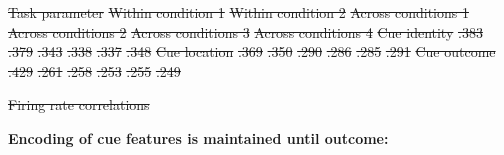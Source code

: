 \documentclass[11pt]{article}
\providecommand{\DIFdel}[1]{{\protect\color{red}\sout{#1}}}                      %
\providecommand{\DIFdelend}{} %
\providecommand{\DIFdelFL}[1]{\DIFdel{#1}} %
\providecommand{\DIFdelbeginFL}{} %
\providecommand{\DIFdelendFL}{} %
\newcommand{\DIFscaledelfig}{0.5}
\newlength{\DIFdelgraphicswidth} %
\newlength{\DIFdelgraphicsheight} %
\newcommand{\DIFdelincludegraphics}[2][]{%
\sbox{\DIFdelgraphicsbox}{\DIFOincludegraphics[#1]{#2}}%
\settoboxwidth{\DIFdelgraphicswidth}{\DIFdelgraphicsbox} %
\settoboxtotalheight{\DIFdelgraphicsheight}{\DIFdelgraphicsbox} %
\scalebox{\DIFscaledelfig}{%
\parbox[b]{\DIFdelgraphicswidth}{\usebox{\DIFdelgraphicsbox}\\[-\baselineskip] \rule{\DIFdelgraphicswidth}{0em}}\llap{\resizebox{\DIFdelgraphicswidth}{\DIFdelgraphicsheight}{%
\setlength{\unitlength}{\DIFdelgraphicswidth}%
\begin{picture}(1,1)%
\thicklines\linethickness{2pt} %
{\color[rgb]{1,0,0}\put(0,0){\framebox(1,1){}}}%
{\color[rgb]{1,0,0}\put(0,0){\line( 1,1){1}}}%
{\color[rgb]{1,0,0}\put(0,1){\line(1,-1){1}}}%
\end{picture}%
}\hspace*{3pt}}} %
} %
\DeclareRobustCommand{\DIFdelend}{\DIFOaddend \let\includegraphics\DIFOincludegraphics} %
\DeclareRobustCommand{\DIFdelbeginFL}{\DIFOdelbeginFL \let\includegraphics\DIFdelincludegraphics} %
\DeclareRobustCommand{\DIFdelendFL}{\DIFOaddendFL \let\includegraphics\DIFOincludegraphics} %
\begin{document}
{%
\DIFdelFL{Task parameter                                 }%
\DIFdelFL{Within condition 1        }%
\DIFdelFL{Within condition 2        }%
\DIFdelFL{Across conditions 1        }%
\DIFdelFL{Across conditions 2       }%
\DIFdelFL{Across conditions 3       }%
\DIFdelFL{Across conditions 4}%
\DIFdelFL{Cue identity       }%
\DIFdelFL{.383         }%
\DIFdelFL{.379          }%
\DIFdelFL{.343          }%
\DIFdelFL{.338          }%
\DIFdelFL{.337        }%
\DIFdelFL{.348}%
\DIFdelFL{Cue location       }%
\DIFdelFL{.369         }%
\DIFdelFL{.350          }%
\DIFdelFL{.290          }%
\DIFdelFL{.286          }%
\DIFdelFL{.285        }%
\DIFdelFL{.291}%
\DIFdelFL{Cue outcome       }%
\DIFdelFL{.429        }%
\DIFdelFL{.261          }%
\DIFdelFL{.258        }%
\DIFdelFL{.253          }%
\DIFdelFL{.255        }%
\DIFdelFL{.249}%

\DIFdelendFL {\DIFdelbeginFL \DIFdelFL{Firing rate correlations}%

\DIFdelend \bf Encoding of cue features is maintained until outcome:}

}
\end{document}
